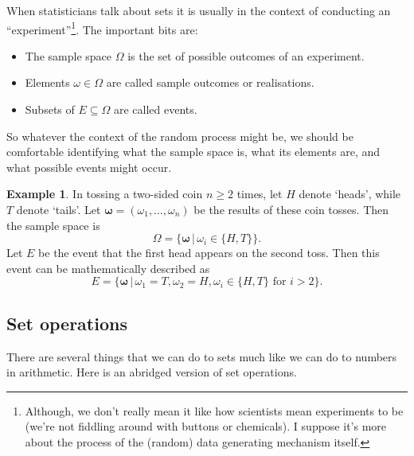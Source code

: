 \documentclass[
]{book}
\providecommand{\tightlist}{%
  \setlength{\itemsep}{0pt}\setlength{\parskip}{0pt}}
\newcommand{\bomega}{{\boldsymbol\omega}}
\theoremstyle{definition}
\theoremstyle{definition}
\newtheorem{example}{Example}[chapter]
\theoremstyle{definition}
\theoremstyle{definition}
\theoremstyle{remark}
\begin{document}
When statisticians talk about sets it is usually in the context of conducting an ``experiment''\footnote{Although, we don't really mean it like how scientists mean experiments to be (we're not fiddling around with buttons or chemicals). I suppose it's more about the process of the (random) data generating mechanism itself.}.
The important bits are:

\begin{itemize}
\tightlist
\item
  The sample space \(\Omega\) is the set of possible outcomes of an experiment.
\item
  Elements \(\omega \in \Omega\) are called sample outcomes or realisations.
\item
  Subsets of \(E \subseteq \Omega\) are called events.
\end{itemize}

So whatever the context of the random process might be, we should be comfortable identifying what the sample space is, what its elements are, and what possible events might occur.

\begin{example}
In tossing a two-sided coin \(n \geq 2\) times, let \(H\) denote `heads', while \(T\) denote `tails'.
Let \(\bomega = (\omega_1,\dots,\omega_n)\) be the results of these coin tosses.
Then the sample space is \[
\Omega = \Big\{ \bomega \, \big|\, \omega_i \in \{H,T\} \Big\}.
\]
Let \(E\) be the event that the first head appears on the second toss. Then this event can be mathematically described as
\[
E = \Big\{ \bomega \, \big|\, \omega_1 = T, \omega_2 = H, \omega_i \in \{H,T\} \text{ for } i > 2 \Big\}.
\]
\end{example}

\hypertarget{set-operations}{%
\subsection{Set operations}\label{set-operations}}

There are several things that we can do to sets much like we can do to numbers in arithmetic. Here is an abridged version of set operations.
\end{document}
